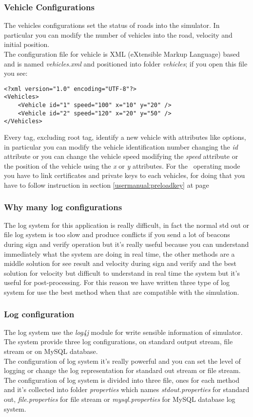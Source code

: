 \subsubsection{Vehicle Configurations}\label{usermanual:vehicleconfigurations}
The vehicles configurations set the status of roads into the simulator. In particular you can modify the number of vehicles into the road, velocity and initial position.\\
The configuration file for vehicle is XML (eXtensible Markup Language) based and is named \textit{vehicles.xml} and positioned into folder \textit{vehicles}; if you open this file you see:
\begin{verbatim}
<?xml version="1.0" encoding="UTF-8"?>
<Vehicles>
    <Vehicle id="1" speed="100" x="10" y="20" />
    <Vehicle id="2" speed="120" x="20" y="50" />
</Vehicles>
\end{verbatim}
Every tag, excluding root tag, identify a new vehicle with attributes like options, in particular you can modify the vehicle identification number changing the \textit{id} attribute or you can change the vehicle speed modifying the \textit{speed} attribute or the position of the vehicle using the \textit{x} or \textit{y} attributes.
For the \baseline~operating mode you have to link certificates and private keys to each vehicles, for doing that you have to follow instruction in section \ref{usermanual:preloadkey} at page \pageref{usermanual:preloadkey}
\subsubsection{Why many log configurations}
The log system for this application is really difficult, in fact the normal std out or file log system is too slow and produce conflicts if you send a lot of beacons during sign and verify operation but it's really useful because you can understand immediately what the system are doing in real time, the other methods are a middle solution for see result and velocity during sign and verify and the best solution for velocity but difficult to understand in real time the system but it's useful for post-processing. For this reason we have written three type of log system for use the best method when that are compatible with the simulation.
\subsubsection{Log configuration}\label{usermanual:logconfiguration}
The log system use the \textit{log4j} module for write sensible information of simulator. The system provide three log configurations, on standard output stream, file stream or on MySQL database.\\
The configuration of log system it's really powerful and you can set the level of logging or change the log representation for standard out stream or file stream. The configuration of log system is divided into three file, ones for each method and it's collected into folder \textit{properties} which names \textit{stdout.properties} for standard out, \textit{file.properties} for file stream or \textit{mysql.properties} for MySQL database log system.
